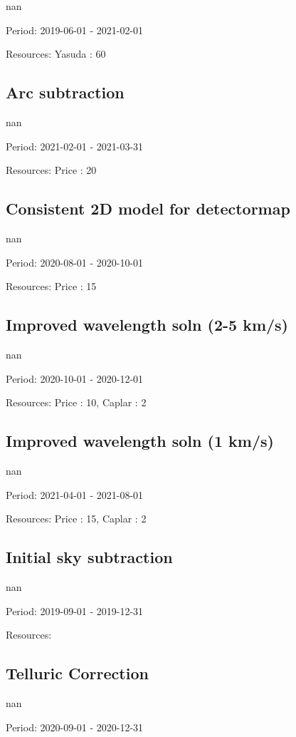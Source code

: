 nan

Period: 2019-06-01 - 2021-02-01

Resources: Yasuda : 60

\subsection{Arc subtraction}

nan

Period: 2021-02-01 - 2021-03-31

Resources: Price : 20

\subsection{Consistent 2D model for detectormap}

nan

Period: 2020-08-01 - 2020-10-01

Resources: Price : 15

\subsection{Improved wavelength soln (2-5 km/s)}

nan

Period: 2020-10-01 - 2020-12-01

Resources: Price : 10, Caplar : 2

\subsection{Improved wavelength soln (1 km/s)}

nan

Period: 2021-04-01 - 2021-08-01

Resources: Price : 15, Caplar : 2

\subsection{Initial sky subtraction}

nan

Period: 2019-09-01 - 2019-12-31

Resources: 

\subsection{Telluric Correction}

nan

Period: 2020-09-01 - 2020-12-31

